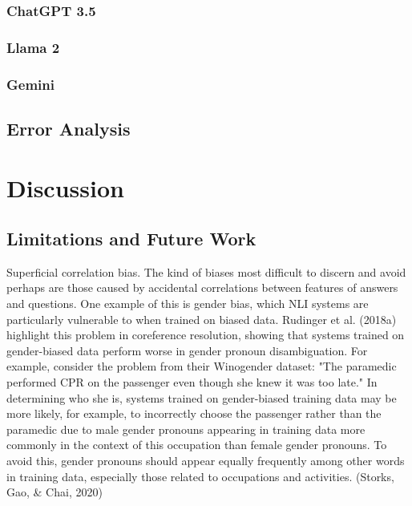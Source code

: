 \documentclass[fleqn,moreauthors,10pt]{ds_report}
\begin{document}
\subsubsection*{ChatGPT 3.5}

\subsubsection*{Llama 2}

\subsubsection*{Gemini}

\subsection*{Error Analysis}


\section*{Discussion}

\subsection*{Limitations and Future Work}

Superficial correlation bias. The kind of biases most difficult to discern and avoid perhaps are those caused by accidental correlations between features of answers and questions. One example of this is gender bias, which NLI systems are particularly vulnerable to when trained on biased data. Rudinger et al. (2018a) highlight this problem in coreference resolution, showing that systems trained on gender-biased data perform worse in gender pronoun disambiguation. For example, consider the problem from their Winogender dataset: "The paramedic performed CPR on the passenger even though she knew it was too late." In determining who she is, systems trained on gender-biased training data may be more likely, for example, to incorrectly choose the passenger rather than the paramedic due to male gender pronouns appearing in training data more commonly in the context of this occupation than female gender pronouns. To avoid this, gender pronouns should appear equally frequently among other words in training data, especially those related to occupations and activities. (Storks, Gao, \& Chai, 2020)
\end{document}
